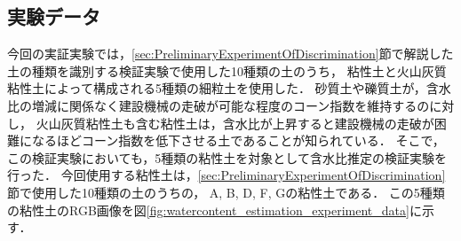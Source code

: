 \subsection{実験データ}
\label{ssec:EstimationExperimentalProcedure}

今回の実証実験では，\ref{sec:PreliminaryExperimentOfDiscrimination}節で解説した土の種類を識別する検証実験で使用した10種類の土のうち，
粘性土と火山灰質粘性土によって構成される5種類の細粒土を使用した．%
砂質土や礫質土が，含水比の増減に関係なく建設機械の走破が可能な程度のコーン指数を維持するのに対し，
火山灰質粘性土も含む粘性土は，含水比が上昇すると建設機械の走破が困難になるほどコーン指数を低下させる土であることが知られている\cite{Meyer1961}．%
そこで，この検証実験においても，5種類の粘性土を対象として含水比推定の検証実験を行った．
今回使用する粘性土は，\ref{sec:PreliminaryExperimentOfDiscrimination}節で使用した10種類の土のうちの，
A, B, D, F, Gの粘性土である．
この5種類の粘性土のRGB画像を図\ref{fig:watercontent_estimation_experiment_data}に示す．


